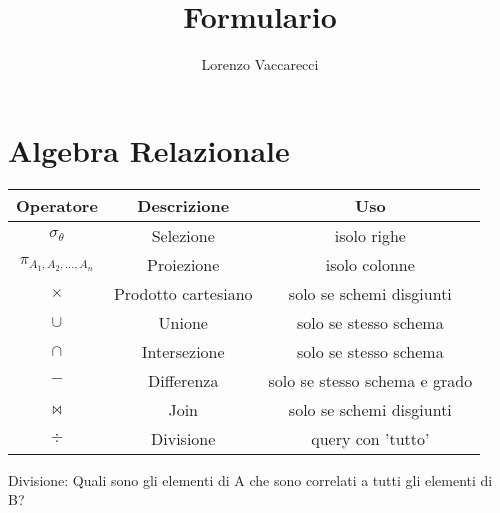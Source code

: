 \documentclass[10pt]{article}
\author{Lorenzo Vaccarecci}
\title{Formulario}
\date{}
\begin{document}
\maketitle
\section{Algebra Relazionale}
\begin{table}[h]
    \centering
    \begin{tabular}{|c|c|c|}
    \hline
    \textbf{Operatore} & \textbf{Descrizione} & \textbf{Uso}\\
    \hline
    $\sigma_{\theta}$ & Selezione & isolo righe\\
    \hline
    $\pi_{A_{1}, A_{2}, \ldots, A_{n}}$ & Proiezione & isolo colonne\\
    \hline
    $\times$ & Prodotto cartesiano & solo se schemi disgiunti\\
    \hline
    $\cup$ & Unione & solo se stesso schema\\
    \hline
    $\cap$ & Intersezione & solo se stesso schema\\
    \hline
    $-$ & Differenza & solo se stesso schema e grado\\
    \hline
    $\bowtie$ & Join & solo se schemi disgiunti\\
    \hline
    $\div$ & Divisione & query con 'tutto'\\
    \hline
    \end{tabular}
\end{table}
Divisione: Quali sono gli elementi di A che sono correlati a tutti gli elementi di B?
\end{document}
